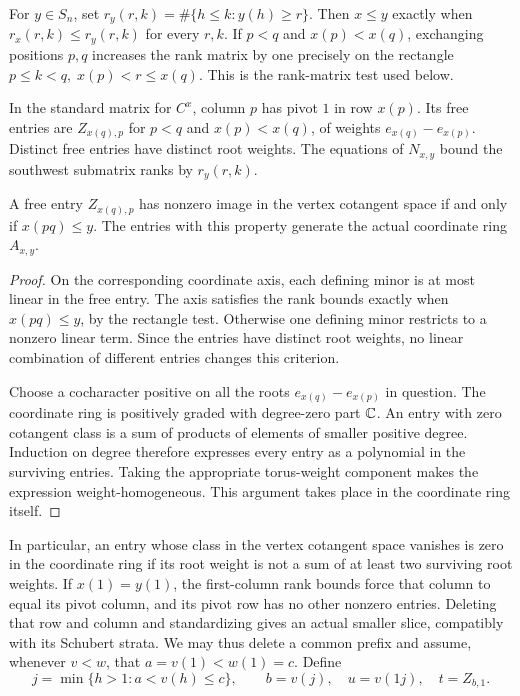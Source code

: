 For $y\in S_n$, set $r_y(r,k)=\#\{h\leq k:y(h)\geq r\}$.
Then $x\leq y$ exactly when $r_x(r,k)\leq r_y(r,k)$ for every $r,k$.
If $p<q$ and $x(p)<x(q)$, exchanging positions $p,q$ increases the rank
matrix by one precisely on the rectangle
$p\leq k<q,\; x(p)<r\leq x(q)$.
This is the rank-matrix test used below.

In the standard matrix for $C^x$, column $p$ has pivot $1$ in row $x(p)$.
Its free entries are $Z_{x(q),p}$ for $p<q$ and $x(p)<x(q)$, of weights
$e_{x(q)}-e_{x(p)}$. Distinct free entries have distinct root weights.
The equations of $N_{x,y}$ bound the southwest submatrix ranks by
$r_y(r,k)$.

\begin{lemma}\label{ta:tangent}
A free entry $Z_{x(q),p}$ has nonzero image in the vertex cotangent space
if and only if $x(pq)\leq y$. The entries with this property generate the
actual coordinate ring $A_{x,y}$.
\end{lemma}

\begin{proof}
On the corresponding coordinate axis, each defining minor is at most
linear in the free entry. The axis satisfies the rank bounds exactly when
$x(pq)\leq y$, by the rectangle test. Otherwise one defining minor
restricts to a nonzero linear term. Since the entries have distinct root
weights, no linear combination of different entries changes this criterion.

Choose a cocharacter positive on all the roots $e_{x(q)}-e_{x(p)}$ in
question. The coordinate ring is positively graded with degree-zero part
$\mathbb C$. An entry with zero cotangent class is a sum of products of elements
of smaller positive degree. Induction on degree therefore expresses every
entry as a polynomial in the surviving entries. Taking the appropriate
torus-weight component makes the expression weight-homogeneous. This
argument takes place in the coordinate ring itself.
\end{proof}

In particular, an entry whose class in the vertex cotangent space
vanishes is zero in the coordinate ring if its root weight is not a
sum of at least two surviving root weights.
If $x(1)=y(1)$, the first-column rank bounds force that column to equal
its pivot column, and its pivot row has no other nonzero entries.
Deleting that row and column and standardizing gives an actual smaller
slice, compatibly with its Schubert strata. We may thus delete a common
prefix and assume, whenever $v<w$, that $a=v(1)<w(1)=c$.
Define
\[
 j=\min\{h>1:a<v(h)\leq c\},\qquad
 b=v(j),\quad u=v(1j),\quad t=Z_{b,1}.
\]

